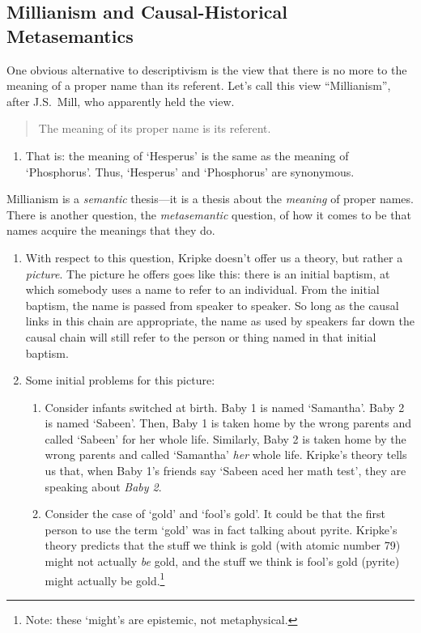 \documentclass[landscape, two column, full page,reqno]{article}
\newcommand{\qd}{\begin{quote}\begin{description}  [align=left,style=nextline,leftmargin=*,labelsep=0pt,font=\normalfont]}
\newcommand{\zd}{\end{description}\end{quote}}
\newcommand{\qe}{\begin{enumerate}[align=left,style=nextline,leftmargin=17pt,labelsep=5pt,font=\normalfont]}
\newcommand{\ze}{\end{enumerate}}
\newcommand{\p}{\item}
\newcommand{\e}{\emph}
\newcommand{\s}{\textsc}
\begin{document}
\subsection{Millianism and Causal-Historical Metasemantics}

\p One obvious alternative to descriptivism is the view that there is no more to the meaning of a proper name than its referent.  Let's call this view ``Millianism'', after J.S.~Mill, who apparently held the view.
	\qd
	\p[\s{Millianism}] The meaning of its proper name is its referent.
	\zd 
	\qe
	\p That is: the meaning of `Hesperus' is the same as the meaning of `Phosphorus'.  Thus, `Hesperus' and `Phosphorus' are synonymous.
	\ze 
\p Millianism is a \e{semantic} thesis---it is a thesis about the \e{meaning} of proper names.  There is another question, the \e{metasemantic} question, of how it comes to be that names acquire the meanings that they do.
	\qe
	\p With respect to this question, Kripke doesn't offer us a theory, but rather a \e{picture}.  The picture he offers goes like this: there is an initial baptism, at which somebody uses a name to refer to an individual.  From the initial baptism, the name is passed from speaker to speaker. So long as the causal links in this chain are appropriate, the name as used by speakers far down the causal chain will still refer to the person or thing named in that initial baptism.
	\p Some initial problems for this picture:  
		\qe
		\p Consider infants switched at birth.  Baby 1 is named `Samantha'.   Baby 2 is named `Sabeen'.  Then, Baby 1 is taken home by the wrong parents and called `Sabeen' for her whole life.  Similarly, Baby 2 is taken home by the wrong parents and called `Samantha' \e{her} whole life.  Kripke's theory tells us that, when Baby 1's friends say `Sabeen aced her math test', they are speaking about \e{Baby 2}.
		\p Consider the case of `gold' and `fool's gold'.  It could be that the first person to use the term `gold' was in fact talking about pyrite.  Kripke's theory predicts that  the stuff we think is gold (with atomic number 79) might not actually \e{be} gold, and the stuff we think is fool's gold (pyrite) might actually  be gold.\footnote{ Note: these `might's are epistemic, not metaphysical.}
		\ze 
	\ze 
	
\end{document}
